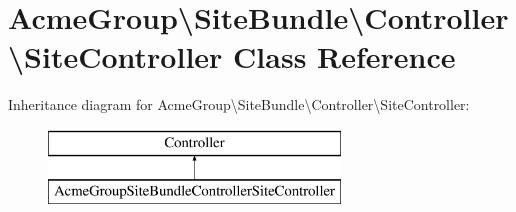 \hypertarget{class_acme_group_1_1_site_bundle_1_1_controller_1_1_site_controller}{\section{Acme\+Group\textbackslash{}Site\+Bundle\textbackslash{}Controller\textbackslash{}Site\+Controller Class Reference}
\label{class_acme_group_1_1_site_bundle_1_1_controller_1_1_site_controller}
}
Inheritance diagram for Acme\+Group\textbackslash{}Site\+Bundle\textbackslash{}Controller\textbackslash{}Site\+Controller\+:\begin{figure}[H]
\begin{center}
\leavevmode
\includegraphics[height=2.000000cm]{class_acme_group_1_1_site_bundle_1_1_controller_1_1_site_controller}
\end{center}
\end{figure}
